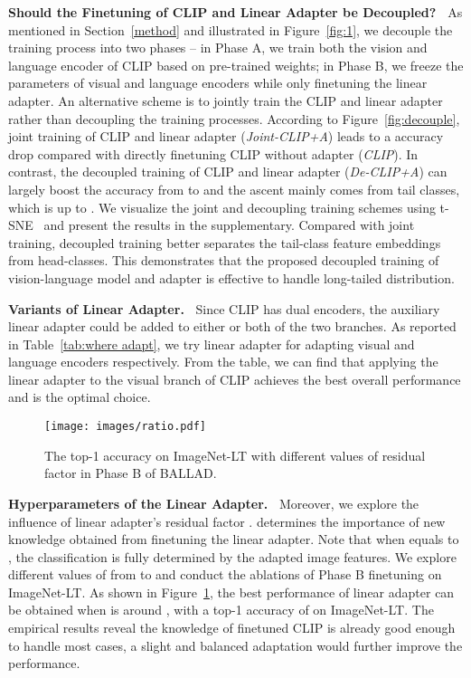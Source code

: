 \documentclass[10pt,twocolumn,letterpaper]{article}
\newcommand{\approach}{\textsc{BALLAD}}
\begin{document}
\noindent\textbf{Should the Finetuning of CLIP and Linear Adapter be Decoupled?~}
As mentioned in Section~\ref{method} and illustrated in Figure~\ref{fig:1}, we decouple the training process into two phases -- in Phase A, we train both the vision and language encoder of CLIP based on pre-trained weights; in Phase B, we freeze the parameters of visual and language encoders while only finetuning the linear adapter. An alternative scheme is to jointly train the CLIP and linear adapter rather than decoupling the training processes. According to Figure~\ref{fig:decouple}, joint training of CLIP and linear adapter (\emph{Joint-CLIP+A}) leads to a  accuracy drop compared with directly finetuning CLIP without adapter (\emph{CLIP}). In contrast, the decoupled training of CLIP and linear adapter (\emph{De-CLIP+A}) can largely boost the accuracy from  to  and the ascent mainly comes from tail classes, which is up to .
We visualize the joint and decoupling training schemes using t-SNE~\cite{van2008visualizing} and present the results in the supplementary. Compared with joint training, decoupled training better separates the tail-class feature embeddings from head-classes. This demonstrates that the proposed decoupled training of vision-language model and adapter is effective to handle long-tailed distribution.

\noindent\textbf{Variants of Linear Adapter.~}
Since CLIP has dual encoders, the auxiliary linear adapter could be added to either or both of the two branches. As reported in Table~\ref{tab:where adapt}, we try linear adapter for adapting visual and language encoders respectively.
From the table, we can find that applying the linear adapter to the visual branch of CLIP achieves the best overall performance and is the optimal choice.



\begin{figure}[t]
\centering
\texttt{[image: images/ratio.pdf]}
\vspace*{-13pt}
\caption{The top-1 accuracy on ImageNet-LT with different values of residual factor  in Phase B of \approach{}.}
\vspace*{-13pt}
\label{fig:ratio}
\end{figure}

\noindent\textbf{Hyperparameters of the Linear Adapter.~}
Moreover, we explore the influence of linear adapter's residual factor .  determines the importance of new knowledge obtained from finetuning the linear adapter.
Note that when  equals to , the classification is fully determined by the adapted image features. We explore different values of  from  to  and conduct the ablations of Phase B finetuning on ImageNet-LT.
As shown in Figure~\ref{fig:ratio}, the best performance of linear adapter can be obtained when  is around , with a top-1 accuracy of  on ImageNet-LT. The empirical results reveal the knowledge of finetuned CLIP is already good enough to handle most cases, a slight and balanced adaptation would further improve the performance.
\end{document}
